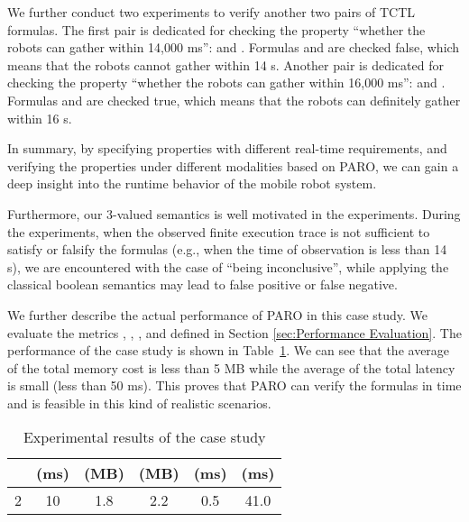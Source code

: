 \documentclass[10pt,conference,compsocconf,letterpaper]{IEEEtran}
\begin{document}
We further conduct two experiments to verify another two pairs of TCTL formulas. The first pair is dedicated for checking the property  ``whether the robots can gather within 14,000 ms'':  and . Formulas  and  are checked false, which means that the robots cannot gather within 14 s. Another pair is dedicated for checking the property  ``whether the robots can gather within 16,000 ms'':  and . Formulas  and  are checked true, which means that the robots can definitely gather within 16 s.

In summary, by specifying properties with different real-time requirements, and verifying the properties under different modalities based on \textsf{PARO}, we can gain a deep insight into the runtime behavior of the mobile robot system.

Furthermore, our 3-valued semantics is well motivated in the experiments. During the experiments, when the observed finite execution trace is not sufficient to satisfy or falsify the formulas (e.g., when the time of observation is less than 14 s), we are encountered with the case of ``being inconclusive'', while applying the classical boolean semantics may lead to false positive or false negative.

We further describe the actual performance of \textsf{PARO} in this case study. We evaluate the metrics , , , and  defined in Section \ref{sec:Performance Evaluation}. The performance of the case study is shown in Table~\ref{T:case study}. We can see that the average of the total memory cost  is less than 5 MB while the average of the total latency  is small (less than 50 ms). This proves that \textsf{PARO} can verify the formulas in time and is feasible in this kind of realistic scenarios.
\begin{table}[tbp]
    \caption{Experimental results of the case study}
    \label{T:case study}
    \centering
    \begin{tabular}{cc|cccc}\hline
         &  (ms) &  (MB) &  (MB) &  (ms) &  (ms) \\ \hline\hline
        2 & 10 & 1.8 & 2.2 & 0.5 & 41.0 \\ \hline
    \end{tabular}
\end{table}
\end{document}
